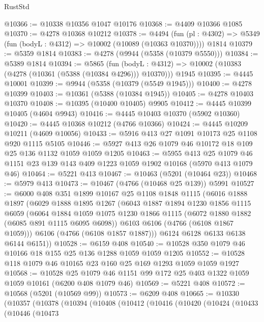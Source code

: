 \begin{lexlean}{RustStd}
\begin{coremodule}
@10366 := @10338 @10356 @1047 @10176
@10368 := @4409 @10366 @1085
@10370 := @4278 @10368 @10212
@10378 := @4494
    (fun (pl : @4302) => @5349 (fun (bodyL : @4312) => @10002 (@10089 (@10363 @10370))))
    @1814
@10379 := @5359 @1814
@10383 := @4278 (@9944 (@5358 (@10379 @5550)))
@10384 := @5389 @1814
@10394 := @5865
    (fun (bodyL : @4312) => @10002 (@10383 (@4278 (@10361 (@5388 (@10384 @4296))) @10370)))
    @1945
@10395 := @4445 @10001
@10399 := @9944 (@5358 (@10379 (@5549 @1945)))
@10400 := @4278 @10399
@10403 := @10361 (@5388 (@10384 @1945))
@10405 := @4278 @10403 @10370
@10408 := @10395 (@10400 @10405) @9905
@10412 := @4445 @10399 @10405 (@4604 @9943)
@10416 := @4445 @10403 @10370 (@5902 @10360)
@10420 := @4445 @10368 @10212 (@4766 @10366)
@10424 := @4445 @10209 @10211 (@4609 @10056)
@10433 := @5916 @413 @27 @1091 @10173 @25 @1108 @920 @1115 @5105
@10446 := @5927 @413 @26 @1079 @46 @10172 @18 @109 @25 @136 @1132 @1059 @1059 @1205
@10463 := @5955
    @413
    @25
    @1079
    @46
    @1151
    @23
    @139
    @143
    @409
    @1223
    @1059
    @1902
    @10168
    (@5970 @413 @1079 @46)
@10464 := @5221 @413
@10467 := @10463 (@5201 (@10464 @23))
@10468 := @5979 @413
@10473 := @10467 (@4766 (@10468 @25 @139)) @5991
@10527 := @6000
    @408
    @351
    @1899
    @10167
    @25
    @1108
    @1848
    @1115
    (@6016
      @1888
      @1897
      (@6029
        @1888
        @1895
        @1267
        (@6043
          @1887
          @1894
          @1230
          @1856
          @1115
          @6059
          (@6064
            @1884
            @1059
            @1075
            @1230
            @1866
            @1115
            (@6072 @1880 @1882 (@6085 @891 @1115 @6095 @6098))
            @6103
            @6106
            (@4766 (@6108 @1867 @1059)))
          @6106
          (@4766 (@6108 @1857 @1887)))
        @6124
        @6128
        @6133
        @6138
        @6144
        @6151))
@10528 := @6159 @408
@10540 := @10528 @350 @1079 @46 @10166 @18 @155 @25 @136 @1288 @1059 @1059 @1205
@10552 := @10528 @118 @1079 @46 @10165 @23 @160 @25 @169 @1293 @1059 @1059 @1927
@10568 := @10528
    @25
    @1079
    @46
    @1151
    @99
    @172
    @25
    @403
    @1322
    @1059
    @1059
    @10161
    (@6200 @408 @1079 @46)
@10569 := @5221 @408
@10572 := @10568 (@5201 (@10569 @99))
@10573 := @6209 @408
@10665 := @10330
    (@10357
      (@10378
        (@10394
          (@10408
            (@10412
              (@10416
                (@10420
                  (@10424
                    (@10433
                      (@10446
                        (@10473

\end{coremodule}
\end{lexlean}
